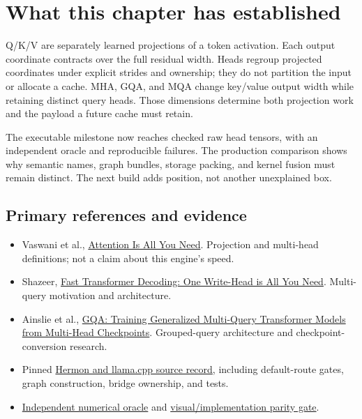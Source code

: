 \section{What this chapter has
established}\label{what-this-chapter-has-established}

Q/K/V are separately learned projections of a token activation. Each
output coordinate contracts over the full residual width. Heads regroup
projected coordinates under explicit strides and ownership; they do not
partition the input or allocate a cache. MHA, GQA, and MQA change
key/value output width while retaining distinct query heads. Those
dimensions determine both projection work and the payload a future cache
must retain.

The executable milestone now reaches checked raw head tensors, with an
independent oracle and reproducible failures. The production comparison
shows why semantic names, graph bundles, storage packing, and kernel
fusion must remain distinct. The next build adds position, not another
unexplained box.

\subsection{Primary references and
evidence}\label{primary-references-and-evidence}

\begin{itemize}
\tightlist
\item
  Vaswani et al., \href{https://arxiv.org/abs/1706.03762}{Attention Is
  All You Need}. Projection and multi-head definitions; not a claim
  about this engine's speed.
\item
  Shazeer, \href{https://arxiv.org/abs/1911.02150}{Fast Transformer
  Decoding: One Write-Head is All You Need}. Multi-query motivation and
  architecture.
\item
  Ainslie et al., \href{https://arxiv.org/abs/2305.13245}{GQA: Training
  Generalized Multi-Query Transformer Models from Multi-Head
  Checkpoints}. Grouped-query architecture and checkpoint-conversion
  research.
\item
  Pinned
  \href{https://github.com/hermonai/inside-the-llm-engine/blob/astra-visual-rewrite/research/part-02/chapter-08-queries-keys-and-values.md}{Hermon
  and llama.cpp source record}, including default-route gates, graph
  construction, bridge ownership, and tests.
\item
  \href{https://github.com/hermonai/inside-the-llm-engine/blob/astra-visual-rewrite/code/reference/python/chapter08_qkv_oracle.py}{Independent
  numerical oracle} and
  \href{https://github.com/hermonai/inside-the-llm-engine/blob/astra-visual-rewrite/scripts/check-qkv-visual-parity.py}{visual/implementation
  parity gate}.
\end{itemize}



